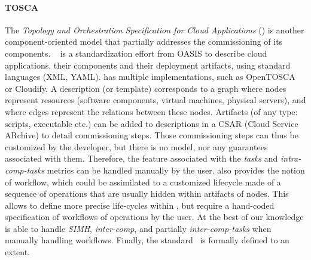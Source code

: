 \paragraph{TOSCA}
The \emph{Topology and Orchestration Specification for Cloud
Applications} (\tosca) is another component-oriented model that
partially addresses the commissioning of its
components. \tosca~\cite{tosca:web,brogi2018} is a standardization
effort from OASIS to describe cloud applications, their components and
their deployment artifacts, using standard languages (\ie XML,
YAML). \tosca has multiple implementations, such as OpenTOSCA~\cite{OpenTOSCA}
or Cloudify. A \tosca description (or template) corresponds to a graph where
nodes represent \tosca resources (\eg software components, virtual
machines, physical servers), and where edges represent the relations
between these nodes. Artifacts (of any type: scripts, executable etc.)
can be added to \tosca descriptions in a CSAR (Cloud Service ARchive)
to detail commissioning steps. Those commissioning steps can thus be
customized by the developer, but there is no model, nor any guarantees
associated with them. Therefore, the feature associated with
the \emph{tasks} and \emph{intra-comp-tasks} metrics can be handled
manually by the user. \tosca also provides the notion of workflow, which could be assimilated to a customized lifecycle made of a sequence of operations that are usually hidden within artifacts of nodes.
This allows to define more precise life-cycles within \tosca, but require a hand-coded specification of workflows of operations by the user. At the best of our knowledge \tosca is able to handle \emph{SIMH}, \emph{inter-comp}, and partially \emph{inter-comp-tasks} when manually handling workflows. Finally, the \tosca standard~\cite{7561358} is formally defined to an extent.


